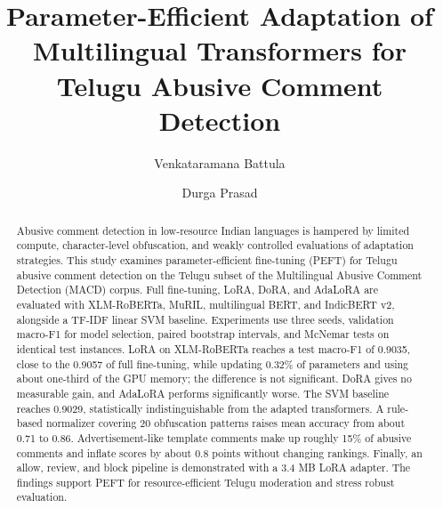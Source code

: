 \documentclass{svproc}
\begin{document}
\mainmatter              %
%
\title{Parameter-Efficient Adaptation of Multilingual Transformers for Telugu Abusive Comment Detection}
%
%
\author{Venkataramana Battula \and Durga Prasad}
%
%

\maketitle              %
\begin{abstract}
Abusive comment detection in low-resource Indian languages is hampered by limited compute, character-level obfuscation, and weakly controlled evaluations of adaptation strategies. This study examines parameter-efficient fine-tuning (PEFT) for Telugu abusive comment detection on the Telugu subset of the Multilingual Abusive Comment Detection (MACD) corpus. Full fine-tuning, LoRA, DoRA, and AdaLoRA are evaluated with XLM-RoBERTa, MuRIL, multilingual BERT, and IndicBERT v2, alongside a TF-IDF linear SVM baseline. Experiments use three seeds, validation macro-F1 for model selection, paired bootstrap intervals, and McNemar tests on identical test instances. LoRA on XLM-RoBERTa reaches a test macro-F1 of 0.9035, close to the 0.9057 of full fine-tuning, while updating 0.32\% of parameters and using about one-third of the GPU memory; the difference is not significant. DoRA gives no measurable gain, and AdaLoRA performs significantly worse. The SVM baseline reaches 0.9029, statistically indistinguishable from the adapted transformers. A rule-based normalizer covering 20 obfuscation patterns raises mean accuracy from about 0.71 to 0.86. Advertisement-like template comments make up roughly 15\% of abusive comments and inflate scores by about 0.8 points without changing rankings. Finally, an allow, review, and block pipeline is demonstrated with a 3.4 MB LoRA adapter. The findings support PEFT for resource-efficient Telugu moderation and stress robust evaluation.
\end{abstract}
\end{document}
